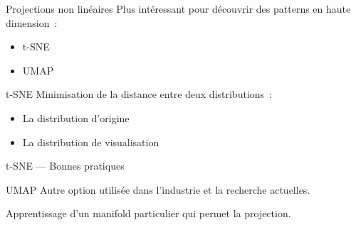 \begin{frame}{Projections non linéaires}
  Plus intéressant pour découvrir des patterns en haute dimension~:

  \begin{itemize}[<+->]
    \item t-SNE
    \item UMAP
  \end{itemize}
\end{frame}

\begin{frame}{t-SNE}
  Minimisation de la distance entre deux distributions~:

  \begin{itemize}[<+->]
    \item La distribution d'origine
    \item La distribution de visualisation
  \end{itemize}
\end{frame}

\begin{frame}{t-SNE --- Bonnes pratiques}
\end{frame}

\begin{frame}{UMAP}
  Autre option utilisée dans l'industrie et la recherche actuelles.

  Apprentissage d'un manifold particulier qui permet la projection.
\end{frame}
